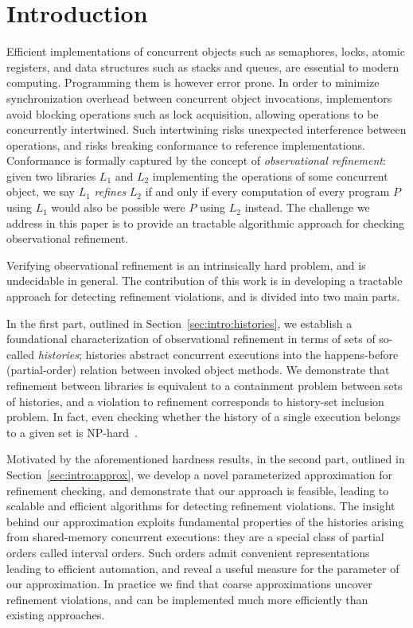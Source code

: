 \section{Introduction}

Efficient implementations of concurrent objects such as semaphores, locks,
atomic registers, and data structures such as stacks and queues, are essential
to modern computing. Programming them is however error prone. In order to
minimize synchronization overhead between concurrent object invocations,
implementors avoid blocking operations such as lock acquisition, allowing
operations to be concurrently intertwined. Such intertwining risks unexpected
interference between operations, and risks breaking conformance to reference
implementations. Conformance is formally captured by the concept of
\emph{observational refinement}: given two libraries $L_1$ and $L_2$
implementing the operations of some concurrent object, we say $L_1$
\emph{refines} $L_2$ if and only if every computation of every program $P$
using $L_1$ would also be possible were $P$ using $L_2$ instead. The challenge
we address in this paper is to provide an tractable algorithmic approach for
checking observational refinement.

Verifying observational refinement is an intrinsically hard problem, and is
undecidable in general. The contribution of this work is in developing a
tractable approach for detecting refinement violations, and is divided into two
main parts.

In the first part, outlined in Section~\ref{sec:intro:histories}, we establish
a foundational characterization of observational refinement in terms of sets of
so-called \emph{histories}; histories abstract concurrent executions into the
happens-before (partial-order) relation between invoked object methods. We
demonstrate that refinement between libraries is equivalent to a containment
problem between sets of histories, and a violation to refinement corresponds to
history-set inclusion problem. In fact, even checking whether the history of a
single execution belongs to a given set is
NP-hard~\cite{journals/siamcomp/GibbonsK97}.

Motivated by the aforementioned hardness results, in the second part, outlined
in Section~\ref{sec:intro:approx}, we develop a novel parameterized
approximation for refinement checking, and demonstrate that our approach is
feasible, leading to scalable and efficient algorithms for detecting refinement
violations. The insight behind our approximation exploits fundamental
properties of the histories arising from shared-memory concurrent executions:
they are a special class of partial orders called interval orders. Such orders
admit convenient representations leading to efficient automation, and reveal a
useful measure for the parameter of our approximation. In practice we find that
coarse approximations uncover refinement violations, and can be implemented
much more efficiently than existing approaches.

